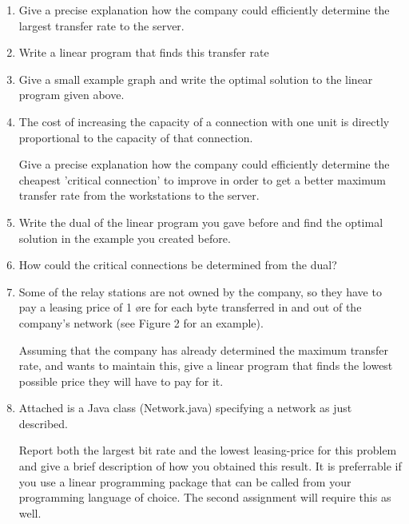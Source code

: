 \documentclass{article}
\begin{document}
\begin{enumerate}
\item Give a precise explanation how the company could efficiently determine
the largest transfer rate to the server. 

\item Write a linear program that finds this transfer rate

\item Give a small example graph and write the optimal solution to the
linear program given above.  

\item The cost of increasing the capacity of a connection with one unit is
directly proportional to the capacity of that connection.  

Give a precise explanation how the company could efficiently determine
the cheapest 'critical connection' to improve in order to get a better
maximum transfer rate from the workstations to the server.  

\item Write the dual of the linear program you gave before and find the
optimal solution in the example you created before.   

\item How could the critical connections be determined from the dual?

\item Some of the relay stations are not owned by the company, so they have
to pay a leasing price of 1 øre for each byte transferred in and out
of the company’s network (see Figure 2 for an example).  

Assuming that the company has already determined the maximum transfer
rate, and wants to maintain this, give a linear program that finds the
lowest possible price they will have to pay for it.

\item Attached is a Java class (Network.java) specifying a network as just
described.

Report both the largest bit rate and the lowest leasing-price for this
problem and give a brief description of how you obtained this
result. It is preferrable if you use a linear programming package that
can be called from your programming language of choice. The second
assignment will require this as well. 
\end{enumerate}
\end{document}
